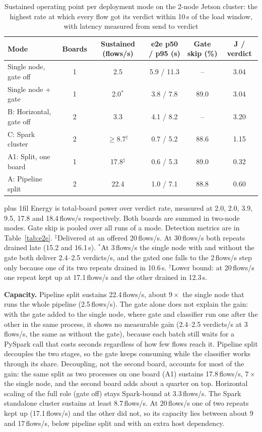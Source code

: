 \documentclass[runningheads]{llncs}
\newcommand{\tabnote}[1]{%
  \vspace{4pt}\par\noindent
  \begin{minipage}{\textwidth}%
    \footnotesize\parindent=0pt\leftskip=0pt\rightskip=0pt\parfillskip=0pt plus 1fil\relax
    #1%
  \end{minipage}}
\begin{document}
\begin{table}[htbp]
  \caption{Sustained operating point per deployment mode on the 2-node Jetson cluster: the highest rate at which every flow got its verdict within 10\,s of the load window, with latency measured from send to verdict}
  \label{tab:benchmark}
  \centering
  \small
  \begin{tabular}{l c c c c c}
    \toprule
    Mode & Boards & Sustained (flows/s) & e2e p50 / p95 (s) & Gate skip (\%) & J / verdict \\
    \midrule
    Single node, gate off & 1 & 2.5 & 5.9 / 11.3 & -- & 3.04 \\
    Single node + gate & 1 & 2.0$^{*}$ & 3.8 / 7.8 & 89.0 & 3.04 \\
    B: Horizontal, gate off & 2 & 3.3 & 4.1 / 8.2 & -- & 3.20 \\
    C: Spark cluster & 2 & $\geq$8.7$^{\dagger}$ & 0.7 / 5.2 & 88.6 & 1.15 \\
    A1: Split, one board & 1 & 17.8$^{\ddagger}$ & 0.6 / 5.3 & 89.0 & 0.32 \\
    A: Pipeline split & 2 & 22.4 & 1.0 / 7.1 & 88.8 & 0.60 \\
    \bottomrule
  \end{tabular}

  \tabnote{Energy is total-board power over verdict rate, measured at 2.0, 2.0, 3.9, 9.5, 17.8 and 18.4\,flows/s respectively. Both boards are summed in two-node modes. Gate skip is pooled over all runs of a mode. Detection metrics are in Table~\ref{tab:e2e}. $^{\ddagger}$Delivered at an offered 20\,flows/s. At 30\,flows/s both repeats drained late (15.2 and 16.1\,s). $^{*}$At 3\,flows/s the single node with and without the gate both deliver 2.4--2.5 verdicts/s, and the gated one falls to the 2\,flows/s step only because one of its two repeats drained in 10.6\,s. $^{\dagger}$Lower bound: at 20\,flows/s one repeat kept up at 17.1\,flows/s and the other drained in 12.3\,s.}
\end{table}

\textbf{Capacity.} Pipeline split sustains 22.4\,flows/s, about $9\times$ the single node that runs the whole pipeline (2.5\,flows/s). The gate alone does not explain the gain: with the gate added to the single node, where gate and classifier run one after the other in the same process, it shows no measurable gain (2.4--2.5 verdicts/s at 3\,flows/s, the same as without the gate), because each batch still waits for a PySpark call that costs seconds regardless of how few flows reach it. Pipeline split decouples the two stages, so the gate keeps consuming while the classifier works through its share. Decoupling, not the second board, accounts for most of the gain: the same split as two processes on one board (A1) sustains 17.8\,flows/s, $7\times$ the single node, and the second board adds about a quarter on top. Horizontal scaling of the full role (gate off) stays Spark-bound at 3.3\,flows/s. The Spark standalone cluster sustains at least 8.7\,flows/s. At 20\,flows/s one of two repeats kept up (17.1\,flows/s) and the other did not, so its capacity lies between about 9 and 17\,flows/s, below pipeline split and with an extra host dependency.
\end{document}
